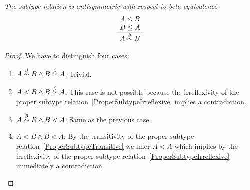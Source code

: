 \begin{theorem}
    \emph{The subtype relation is antisymmetric with respect to beta
    equivalence}
    $$
    \begin{array}{c} 
        A \le B
        \\
        B \le A
     \\ \hline 
        A \stackrel{\beta}{\sim} B
    \end{array}
    $$
    \begin{proof}
        We have to distinguish four cases:
        \begin{enumerate}
        \item $A \stackrel{\beta}{\sim} B \land B \stackrel{\beta}{\sim} A$: Trivial.

        \item $A < B \land B \stackrel{\beta}{\sim} A$: This case is not possible because
            the irreflexivity of the proper subtype
            relation~\ref{ProperSubtypeIrreflexive} implies a contradiction.

        \item $A \stackrel{\beta}{\sim} B \land B < A$: Same as the previous case.

        \item $A < B \land B < A$: By the transitivity of the proper subtype
            relation~\ref{ProperSubtypeTransitive} we infer $A < A$ which
            implies by the irreflexivity of the proper subtype
            relation~\ref{ProperSubtypeIrreflexive} immediately a
            contradiction.
        \end{enumerate}
    \end{proof}
\end{theorem}
